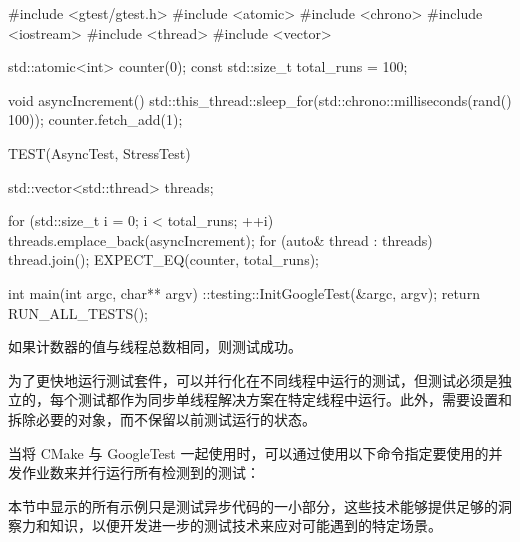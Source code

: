 \begin{cpp}
#include <gtest/gtest.h>
#include <atomic>
#include <chrono>
#include <iostream>
#include <thread>
#include <vector>

std::atomic<int> counter(0);
const std::size_t total_runs = 100;

void asyncIncrement() {
    std::this_thread::sleep_for(std::chrono::milliseconds(rand() %
    100));
    counter.fetch_add(1);
}

TEST(AsyncTest, StressTest) {
    std::vector<std::thread> threads;

    for (std::size_t i = 0; i < total_runs; ++i) {
        threads.emplace_back(asyncIncrement);
    }
    for (auto& thread : threads) {
        thread.join();
    }
    EXPECT_EQ(counter, total_runs);
}

int main(int argc, char** argv) {
    ::testing::InitGoogleTest(&argc, argv);
    return RUN_ALL_TESTS();
}
\end{cpp}

如果计数器的值与线程总数相同，则测试成功。


为了更快地运行测试套件，可以并行化在不同线程中运行的测试，但测试必须是独立的，每个测试都作为同步单线程解决方案在特定线程中运行。此外，需要设置和拆除必要的对象，而不保留以前测试运行的状态。

当将 CMake 与 GoogleTest 一起使用时，可以通过使用以下命令指定要使用的并发作业数来并行运行所有检测到的测试：


本节中显示的所有示例只是测试异步代码的一小部分，这些技术能够提供足够的洞察力和知识，以便开发进一步的测试技术来应对可能遇到的特定场景。











